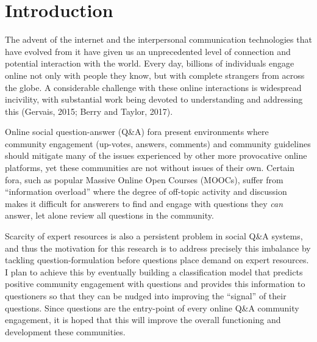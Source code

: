 \documentclass[12pt,preprint, authoryear]{article}
\numberwithin{equation}{section}
\numberwithin{figure}{section}
\numberwithin{table}{section}
\begin{document}
\newpage


\renewcommand{\contentsname}{Contents}
\hypersetup{linkcolor=black}
\tableofcontents
\newpage
\hypersetup{linkcolor=black}
\listoftables
\newpage
\hypersetup{linkcolor=black}
\listoffigures
\hypersetup{linkcolor=black}
\newpage


\renewcommand{\vec}[1]{\mathbf{#1}}



\section{\texorpdfstring{Introduction
\label{Intro}}{Introduction }}\label{introduction}

The advent of the internet and the interpersonal communication
technologies that have evolved from it have given us an unprecedented
level of connection and potential interaction with the world. Every day,
billions of individuals engage online not only with people they know,
but with complete strangers from across the globe. A considerable
challenge with these online interactions is widespread incivility, with
substantial work being devoted to understanding and addressing this
(Gervais, 2015; Berry and Taylor, 2017).

Online social question-answer (Q\&A) fora present environments where
community engagement (up-votes, answers, comments) and community
guidelines should mitigate many of the issues experienced by other more
provocative online platforms, yet these communities are not without
issues of their own. Certain fora, such as popular Massive Online Open
Courses (MOOCs), suffer from ``information overload'' where the degree
of off-topic activity and discussion makes it difficult for answerers to
find and engage with questions they \emph{can} answer, let alone review
all questions in the community.

Scarcity of expert resources is also a persistent problem in social Q\&A
systems, and thus the motivation for this research is to address
precisely this imbalance by tackling question-formulation before
questions place demand on expert resources. I plan to achieve this by
eventually building a classification model that predicts positive
community engagement with questions and provides this information to
questioners so that they can be nudged into improving the ``signal'' of
their questions. Since questions are the entry-point of every online
Q\&A community engagement, it is hoped that this will improve the
overall functioning and development these communities.
\end{document}
